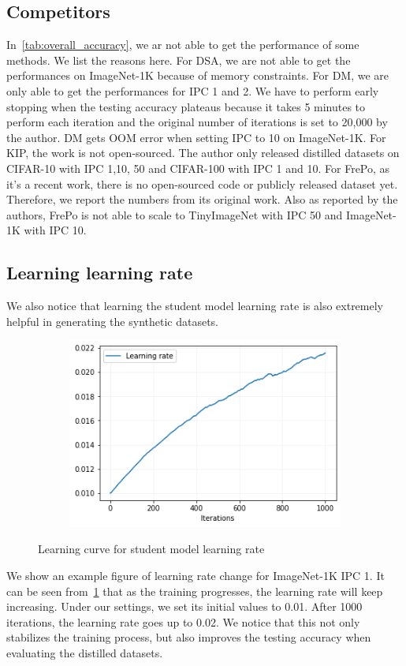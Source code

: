 \documentclass[10pt,twocolumn,letterpaper]{article}
\begin{document}
\subsection{Competitors}
\label{sec.appendix.competitors}
In~\cref{tab:overall_accuracy}, we ar not able to get the performance of some methods. We list the reasons here. For DSA, we are not able to get the performances on ImageNet-1K because of memory constraints. For DM, we are only able to get the performances for IPC 1 and 2. We have to perform early stopping when the testing accuracy plateaus because it takes 5 minutes to perform each iteration and the original number of iterations is set to 20,000 by the author. DM gets OOM error when setting IPC to 10 on ImageNet-1K. For KIP, the work is not open-sourced. The author only released distilled datasets on CIFAR-10 with IPC 1,10, 50 and CIFAR-100 with IPC 1 and 10. For FrePo, as it's a recent work, there is no open-sourced code or publicly released dataset yet. Therefore, we report the numbers from its original work. Also as reported by the authors, FrePo is not able to scale to TinyImageNet with IPC 50 and ImageNet-1K with IPC 10.

\subsection{Learning learning rate}
We also notice that learning the student model learning rate is also extremely helpful in generating the synthetic datasets. 
\begin{figure}
    \centering
    \begin{subfigure}[t]{0.4\textwidth}\centering
    \includegraphics[width=\textwidth]{images/learning_rate.png}
    \end{subfigure}
    \caption{Learning curve for student model learning rate}
    \label{fig:learning_rate}
\end{figure}
We show an example figure of learning rate change for ImageNet-1K IPC 1. It can be seen from~\cref{fig:learning_rate} that as the training progresses, the learning rate will keep increasing. Under our settings, we set its initial values to 0.01. After 1000 iterations, the learning rate goes up to 0.02. We notice that this not only stabilizes the training process, but also improves the testing accuracy when evaluating the distilled datasets.
\end{document}
